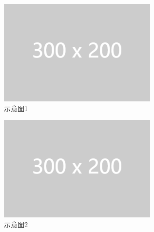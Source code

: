 \documentclass[zihao=-4]{ctexart}
\begin{document}
\begin{spacing}{1.5}
\begin{figure}[htbp]
  \begin{subfigure}{0.31\textwidth}
    \includegraphics[width=\linewidth]{example-image-1.png}
    \caption{示意图1} \label{fig:9aaa}
  \end{subfigure}%
  \hspace*{\fill}   %
  \begin{subfigure}{0.31\textwidth}
    \includegraphics[width=\linewidth]{example-image-1.png}
    \caption{示意图2} \label{fig:9bbb}
  \end{subfigure}
  \hspace*{\fill}   %
  \begin{subfigure}{0.31\textwidth}

\end{subfigure}
\end{figure}
\end{spacing}
\end{document}
